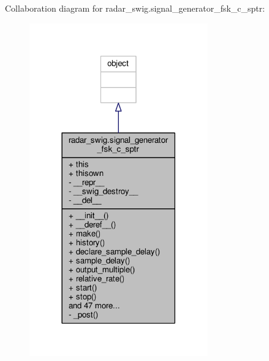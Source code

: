 Collaboration diagram for radar\+\_\+swig.\+signal\+\_\+generator\+\_\+fsk\+\_\+c\+\_\+sptr\+:
\nopagebreak
\begin{figure}[H]
\begin{center}
\leavevmode
\includegraphics[width=218pt]{d3/d59/classradar__swig_1_1signal__generator__fsk__c__sptr__coll__graph}
\end{center}
\end{figure}
